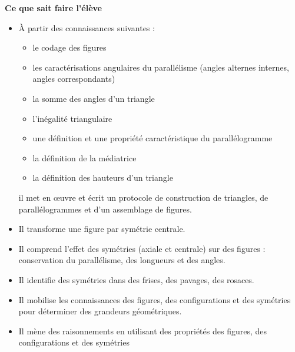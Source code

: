 \documentclass[10pt]{article}
\newcommand{\RR}{\begin{tikzpicture} \draw[Bleu,fill=Bleu] (0,0) circle (0.06); \end{tikzpicture}}
\newenvironment{savoireleves}{%
    \renewcommand{\labelitemi}{\RR}%
    \color{black}%
    \par\textbf{Ce que sait faire l'élève}
    \begin{itemize}
    \setlength{\itemsep}{-0.2em}%
}{
    \end{itemize}
}
\newenvironment{sousitemize}{
    \color{black}%
    \vspace{-1em}%
    \begin{itemize}
    \setlength{\itemsep}{0em}%
}{
    \end{itemize}
}
\begin{document}
    \begin{savoireleves}
        \item À partir des connaissances suivantes :
        \begin{sousitemize}
            \item le codage des figures
            \item les caractérisations angulaires du parallélisme (angles alternes internes, angles correspondants)
            \item la somme des angles d’un triangle
            \item l’inégalité triangulaire
            \item une définition et une propriété caractéristique du parallélogramme
            \item la définition de la médiatrice
            \item la définition des hauteurs d’un triangle
        \end{sousitemize}
        il met en œuvre et écrit un protocole de construction de triangles, de parallélogrammes et d’un assemblage de figures.
        \item Il transforme une figure par symétrie centrale.
        \item Il comprend l’effet des symétries (axiale et centrale) sur des figures : conservation du parallélisme, des longueurs et des angles.
        \item Il identifie des symétries dans des frises, des pavages, des rosaces.
        \item Il mobilise les connaissances des figures, des configurations et des symétries pour déterminer des grandeurs géométriques.
        \item Il mène des raisonnements en utilisant des propriétés des figures, des configurations et des symétries
    \end{savoireleves}
\end{document}
